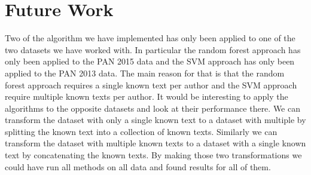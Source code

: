 \section{Future Work} \label{sec:future_work}

Two of the algorithm we have implemented has only been applied to one of the
two datasets we have worked with. In particular the random forest approach has
only been applied to the PAN 2015 data and the \gls{SVM} approach has only been
applied to the PAN 2013 data. The main reason for that is that the random forest
approach requires a single known text per author and the \gls{SVM} approach
require multiple known texts per author. It would be interesting to apply the
algorithms to the opposite datasets and look at their performance there. We can
transform the dataset with only a single known text to a dataset with multiple
by splitting the known text into a collection of known texts. Similarly we can
transform the dataset with multiple known texts to a dataset with a single known
text by concatenating the known texts. By making those two transformations we
could have run all methods on all data and found results for all of them.

